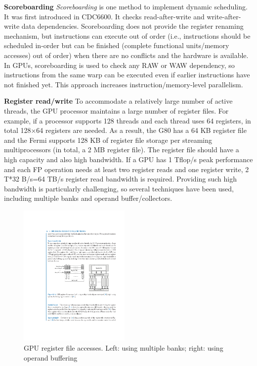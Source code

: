 \documentclass[twocolumn]{article}
\begin{document}
\noindent
\textbf{Scoreboarding} \textit{Scoreboarding} is one method to implement dynamic scheduling. It was first introduced in CDC6600. It checks read-after-write and write-after-write data dependencies. Scoreboarding does not provide the register renaming mechanism, but instructions can execute out of order (i.e., instructions should be scheduled in-order but can be finished (complete functional units/memory accesses) out of order) when there are no conflicts and the hardware is available. In GPUs, scoreboarding is used to check any RAW or WAW dependency, so instructions from the same warp can be executed even if earlier instructions have not finished yet. This approach increases instruction/memory-level parallelism. 

\noindent
\textbf{Register read/write}
To accommodate a relatively large number of active threads, the GPU processor maintains a large number of register files. For example, if a processor supports 128 threads and each thread uses 64 registers, in total 128×64 registers are needed. As a result, the G80 has a 64 KB register file and the Fermi supports 128 KB of register file storage per streaming multiprocessors (in total, a 2 MB register file). The register file should have a high capacity and also high bandwidth. If a GPU has 1 Tflop/s peak performance and each FP operation needs at least two register reads and one register write, 2 T*32 B/s=64 TB/s register read bandwidth is required. Providing such high bandwidth is particularly challenging, so several techniques have been used, including multiple banks and operand buffer/collectors.
\begin{figure}[htb]
        \centering
        \includegraphics[width=0.48\textwidth]{register-file.pdf}
        \caption{GPU register file accesses. Left: using multiple banks; right: using operand buffering}
        \label{fig:register-file}
\end{figure}
\end{document}
